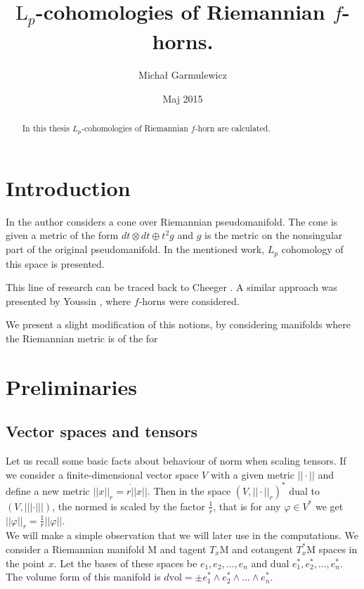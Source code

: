 \documentclass[licencjacka]{pracamgr}
\author{Michał Garmulewicz}
\title{$\mathrm{L}_p$-cohomologies of Riemannian $f$-horns.}
\date{Maj 2015}
\theoremstyle{definition}
\theoremstyle{definition}
\theoremstyle{plain}
\theoremstyle{plain}
\begin{document}
\maketitle

\begin{abstract}
  In this thesis $L_p$-cohomologies of Riemannian $f$-horn are calculated.
\end{abstract}

\tableofcontents

\chapter{Introduction}

In \cite{weber} the author considers a cone over Riemannian
pseudomanifold.  The cone is given a metric of the form $dt \otimes dt
\oplus t^2 g$ and $g$ is the metric on the nonsingular part of the
original pseudomanifold. In the mentioned work, $L_p$ cohomology of
this space is presented.

This line of research can 
be traced back to Cheeger \cite{cheeger}. 
A similar approach was presented by Youssin \cite{youssin}, where $f$-horns
were considered.

 We present a slight modification of this notions, by considering
 manifolds where the Riemannian metric is of the for

\chapter{Preliminaries}
\section{Vector spaces and tensors}
Let us recall some basic facts about behaviour of norm when scaling tensors.
If we consider a finite-dimensional vector space $V$ with a given metric $||
\cdot ||$ and define a new metric $|| x ||_r  = r \dot || x ||$. Then in the
space $(V, || \cdot||_r)^\ast$ dual to $(V, ||| \cdot |||)$, the normed is scaled
by the factor $\frac{1}{r}$, that is for any $\varphi \in V^\ast$ we get
$||\varphi||_r = \frac{1}{r} ||\varphi|| $. \\

We will make a simple observation that we will later use in the
computations.  We consider a Riemannian manifold $\mathrm{M}$ and
tagent $T_x\mathrm{M}$ and cotangent $T_x^\ast\mathrm{M}$ spaces in
the point $x$.  Let the bases of these spaces be $e_1, e_2, ..., e_n$
and dual $e_1^\ast, e_2^\ast, ..., e_n^\ast$. The volume form of this
manifold is $d\mathrm{vol} = \pm e_1^\ast \wedge e_2^\ast \wedge
... \wedge e_n^\ast $. \\
\end{document}
